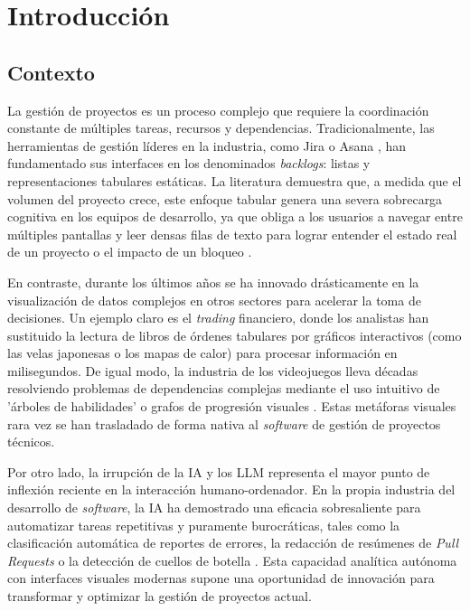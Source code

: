 \chapter{Introducción}
\label{chap:introduccion}

\section{Contexto}
\label{sec:contexto}

La gestión de proyectos es un proceso complejo que requiere la coordinación constante de múltiples tareas, recursos y dependencias. Tradicionalmente, las herramientas de gestión líderes en la industria, como Jira \cite{atlassian_jira} o Asana \cite{asana_software}, han fundamentado sus interfaces en los denominados \emph{backlogs}: listas y representaciones tabulares estáticas. La literatura demuestra que, a medida que el volumen del proyecto crece, este enfoque tabular genera una severa sobrecarga cognitiva en los equipos de desarrollo, ya que obliga a los usuarios a navegar entre múltiples pantallas y leer densas filas de texto para lograr entender el estado real de un proyecto o el impacto de un bloqueo \cite{montgomery2024mining}.

En contraste, durante los últimos años se ha innovado drásticamente en la visualización de datos complejos en otros sectores para acelerar la toma de decisiones. Un ejemplo claro es el \emph{trading} financiero, donde los analistas han sustituido la lectura de libros de órdenes tabulares por gráficos interactivos (como las velas japonesas o los mapas de calor) para procesar información en milisegundos. De igual modo, la industria de los videojuegos lleva décadas resolviendo problemas de dependencias complejas mediante el uso intuitivo de 'árboles de habilidades' o grafos de progresión visuales \cite{munzner2014data}. Estas metáforas visuales rara vez se han trasladado de forma nativa al \emph{software} de gestión de proyectos técnicos.

Por otro lado, la irrupción de la \ac{IA} y los \ac{LLM} representa el mayor punto de inflexión reciente en la interacción humano-ordenador. En la propia industria del desarrollo de \emph{software}, la \ac{IA} ha demostrado una eficacia sobresaliente para automatizar tareas repetitivas y puramente burocráticas, tales como la clasificación automática de reportes de errores, la redacción de resúmenes de \emph{Pull Requests} o la detección de cuellos de botella \cite{hou2023large}. Esta capacidad analítica autónoma con interfaces visuales modernas supone una oportunidad de innovación para transformar y optimizar la gestión de proyectos actual.

